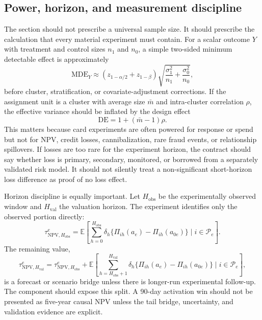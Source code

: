 \documentclass[11pt]{article}
\newcommand{\E}{\mathbb{E}}
\newcommand{\NPV}{\mathrm{NPV}}
\newcommand{\1}{\mathbf{1}}
\begin{document}
\subsection{Power, horizon, and measurement discipline}

The section should not prescribe a universal sample size. It should prescribe
the calculation that every material experiment must contain. For a scalar
outcome $Y$ with treatment and control sizes $n_1$ and $n_0$, a simple
two-sided minimum detectable effect is approximately
\begin{equation}
  \mathrm{MDE}_Y
  \approx
  (z_{1-\alpha/2}+z_{1-\beta})
  \sqrt{\frac{\sigma_1^2}{n_1}+\frac{\sigma_0^2}{n_0}},
  \label{eq:mde}
\end{equation}
before cluster, stratification, or covariate-adjustment corrections. If the
assignment unit is a cluster with average size $\bar{m}$ and intra-cluster
correlation $\rho$, the effective variance should be inflated by the design
effect
\begin{equation}
  \mathrm{DE}=1+(\bar{m}-1)\rho.
  \label{eq:design-effect}
\end{equation}
This matters because card experiments are often powered for response or spend
but not for NPV, credit losses, cannibalization, rare fraud events, or
relationship spillovers. If losses are too rare for the experiment horizon,
the contract should say whether loss is primary, secondary, monitored, or
borrowed from a separately validated risk model. It should not silently treat a
non-significant short-horizon loss difference as proof of no loss effect.

Horizon discipline is equally important. Let $H_{\mathrm{obs}}$ be the
experimentally observed window and $H_{\mathrm{val}}$ the valuation horizon.
The experiment identifies only the observed portion directly:
\begin{equation}
  \tau^{e}_{\NPV,H_{\mathrm{obs}}}
  =
  \E\!\left[
    \sum_{h=0}^{H_{\mathrm{obs}}}\delta_h
    \{\Pi_{ih}(a_e)-\Pi_{ih}(a_{0e})\}
    \mid i\in\mathcal{P}_e
  \right].
  \label{eq:observed-horizon-npv}
\end{equation}
The remaining value,
\begin{equation}
  \tau^{e}_{\NPV,H_{\mathrm{val}}}
  =
  \tau^{e}_{\NPV,H_{\mathrm{obs}}}
  +
  \E\!\left[
    \sum_{h=H_{\mathrm{obs}}+1}^{H_{\mathrm{val}}}\delta_h
    \{\Pi_{ih}(a_e)-\Pi_{ih}(a_{0e})\}
    \mid i\in\mathcal{P}_e
  \right],
  \label{eq:horizon-bridge}
\end{equation}
is a forecast or scenario bridge unless there is longer-run experimental
follow-up. The component should expose this split. A 90-day activation win
should not be presented as five-year causal NPV unless the tail bridge,
uncertainty, and validation evidence are explicit.
\end{document}
